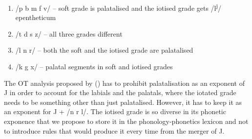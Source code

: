 \documentclass[a4paper, 12pt]{article}
\newcommand{\citeay}[2][]{\citeauthor{#2} (\citeyear[#1]{#2})}
\begin{document}
	\begin{enumerate}[$\gg$]
	\setlength\itemsep{0em}
		\item /p b m f v/ -- soft grade is palatalised and the iotised grade gets /l\textsuperscript{j}/ epentheticum
		\item /t d s z/ -- all three grades different
		\item /l n r/ -- both the soft and the iotised grade are palatalised
		\item /k g x/ -- palatal segments in soft and iotised grades
	\end{enumerate}
	The OT analysis proposed by \citeay{magomedova2017} has to prohibit palatalisation as an exponent of J in order to account for the labials and the palatals, where the iotated grade needs to be something other than just palatalised. However, it has to keep it as an exponent for J + /n r l/. The iotised grade is so diverse in its phonetic exponence that we propose to store it in the phonology-phonetics lexicon and not to introduce rules that would produce it every time from the merger of J.

\printbibliography
\end{document}
